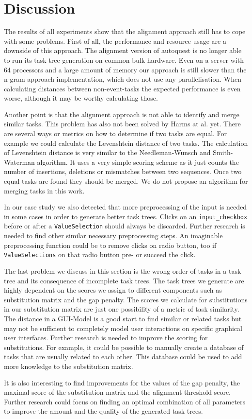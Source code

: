 \section{Discussion}
The results of all experiments show that the alignment approach still has to cope with some problems.
First of all, the performance and resource usage are a downside of this approach. 
The alignment version of autoquest is no longer able to run its task tree generation on common bulk hardware. 
Even on a server with 64 processors and a large amount of memory our approach is still slower than the n-gram approach implementation, which does not use any parallelisation.
When calculating distances between non-event-tasks the expected performance is even worse, although it may be worthy calculating those.

Another point is that the alignment approach is not able to identify and merge similar tasks. 
This problem has also not been solved by Harms at al. yet. 
There are several ways or metrics on how to determine if two tasks are equal.
For example we could calculate the Levenshtein distance of two tasks. 
The calculation of Levenshtein distance is very similar to the Needleman-Wunsch and Smith-Waterman algorithm. 
It uses a very simple scoring scheme as it just counts the number of insertions, deletions or mismatches between two sequences.
Once two equal tasks are found they should be merged. 
We do not propose an algorithm for merging tasks in this work.

In our case study we also detected that more preprocessing of the input is needed in some cases in order to generate better task trees.
Clicks on an \texttt{input\_checkbox} before or after a \texttt{ValueSelection} should always be discarded. 
Further research is needed to find other similar necessary preprocessing steps. 
An imaginable preprocessing function could be to remove clicks on radio button, too if \texttt{ValueSelections} on that radio button pre- or succeed the click.

The last problem we discuss in this section is the wrong order of tasks in a task tree and its consequence of incomplete task trees.
The task trees we generate are highly dependent on the scores we assign to different components such as substitution matrix and the gap penalty.
The scores we calculate for substitutions in our substitution matrix are just one possibility of a metric of task similarity. 
The distance in a GUI-Model is a good start to find similar or related tasks but may not be sufficient to completely model user interactions on specific graphical user interfaces.
Further research is needed to improve the scoring for substitutions. 
For example, it could be possible to manually create a database of tasks that are usually related to each other.
This database could be used to add more knowledge to the substitution matrix.

It is also interesting to find improvements for the values of the gap penalty, the maximal score of the substitution matrix and the alignment threshold score.
Further research could focus on finding an optimal combination of all parameters to improve the amount and the quality of the generated task trees.



